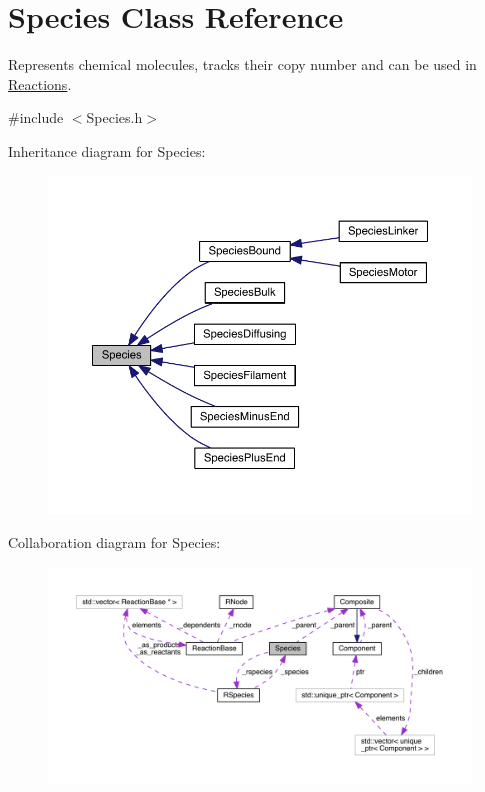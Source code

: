 \hypertarget{classSpecies}{\section{Species Class Reference}
\label{classSpecies}
}


Represents chemical molecules, tracks their copy number and can be used in \hyperlink{classReaction}{Reactions}.  




{\ttfamily \#include $<$Species.\+h$>$}



Inheritance diagram for Species\+:\nopagebreak
\begin{figure}[H]
\begin{center}
\leavevmode
\includegraphics[width=350pt]{classSpecies__inherit__graph}
\end{center}
\end{figure}


Collaboration diagram for Species\+:\nopagebreak
\begin{figure}[H]
\begin{center}
\leavevmode
\includegraphics[width=350pt]{classSpecies__coll__graph}
\end{center}
\end{figure}
